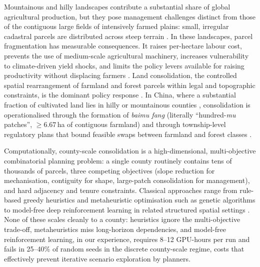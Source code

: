 \documentclass[11pt]{article}
\begin{document}
Mountainous and hilly landscapes contribute a substantial share of global agricultural production, but they pose management challenges distinct from those of the contiguous large fields of intensively farmed plains: small, irregular cadastral parcels are distributed across steep terrain \citep{romeo2020fao,liu2023fragmentation,foley2011solutions}. In these landscapes, parcel fragmentation has measurable consequences. It raises per-hectare labour cost, prevents the use of medium-scale agricultural machinery, increases vulnerability to climate-driven yield shocks, and limits the policy levers available for raising productivity without displacing farmers \citep{niu2023fragmentation,yu2020consolidation,springmann2018options,lambin2011global}. Land consolidation, the controlled spatial rearrangement of farmland and forest parcels within legal and topographic constraints, is the dominant policy response \citep{liu2014land,long2014rural,rounsevell2014challenges}. In China, where a substantial fraction of cultivated land lies in hilly or mountainous counties \citep{huang2018evaluation}, consolidation is operationalised through the formation of \textit{baimu fang} (literally ``hundred-\textit{mu} patches'', $\geq 6.67$\,ha of contiguous farmland) and through township-level regulatory plans that bound feasible swaps between farmland and forest classes \citep{liu2023fragmentation,rockstroem2009safe}.

Computationally, county-scale consolidation is a high-dimensional, multi-objective combinatorial planning problem: a single county routinely contains tens of thousands of parcels, three competing objectives (slope reduction for mechanisation, contiguity for shape, large-patch consolidation for management), and hard adjacency and tenure constraints. Classical approaches range from rule-based greedy heuristics and metaheuristic optimisation such as genetic algorithms \citep{cao2012boundary,deb2002fast,stewart2004multi,aerts2002using,caoStewart2011integrated,ligmann2008integrating} to model-free deep reinforcement learning in related structured spatial settings \citep{zheng2023urban,equihua2024connectivity,janowicz2020geoai,sun2020optimal,verburg2008combined}. None of these scales cleanly to a county: heuristics ignore the multi-objective trade-off, metaheuristics miss long-horizon dependencies, and model-free reinforcement learning, in our experience, requires 8--12 GPU-hours per run and fails in 25--40\% of random seeds in the discrete county-scale regime, costs that effectively prevent iterative scenario exploration by planners.
\end{document}
